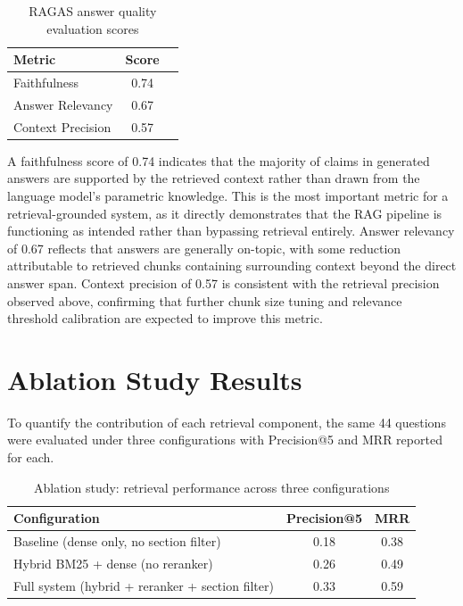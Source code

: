\documentclass[12pt,a4paper]{report}
\begin{document}
\begin{table}[h]
\centering
\begin{tabular}{lcc}
\toprule
\textbf{Metric} & \textbf{Score} \\
\midrule
Faithfulness      & 0.74  \\
Answer Relevancy  & 0.67  \\
Context Precision & 0.57  \\
\bottomrule
\end{tabular}
\caption{RAGAS answer quality evaluation scores}
\label{tab:ragas_results}
\end{table}

\newpage
A faithfulness score of 0.74 indicates that the majority of claims in generated
answers are supported by the retrieved context rather than drawn from the
language model's parametric knowledge. This is the most important metric for a
retrieval-grounded system, as it directly demonstrates that the RAG pipeline is
functioning as intended rather than bypassing retrieval entirely. Answer
relevancy of 0.67 reflects that answers are generally on-topic, with some
reduction attributable to retrieved chunks containing surrounding context beyond
the direct answer span. Context precision of 0.57 is consistent with the
retrieval precision observed above, confirming that further chunk size tuning and
relevance threshold calibration are expected to improve this metric.

\section{Ablation Study Results}

To quantify the contribution of each retrieval component, the same 44 questions
were evaluated under three configurations with Precision@5 and MRR reported for
each.

\begin{table}[h]
\centering
\begin{tabular}{lcc}
\toprule
\textbf{Configuration} & \textbf{Precision@5} & \textbf{MRR} \\
\midrule
Baseline (dense only, no section filter)         & 0.18 & 0.38 \\
Hybrid BM25 + dense (no reranker)                & 0.26 & 0.49 \\
Full system (hybrid + reranker + section filter) & 0.33 & 0.59 \\
\bottomrule
\end{tabular}
\caption{Ablation study: retrieval performance across three configurations}
\label{tab:ablation_results}
\end{table}
\end{document}
